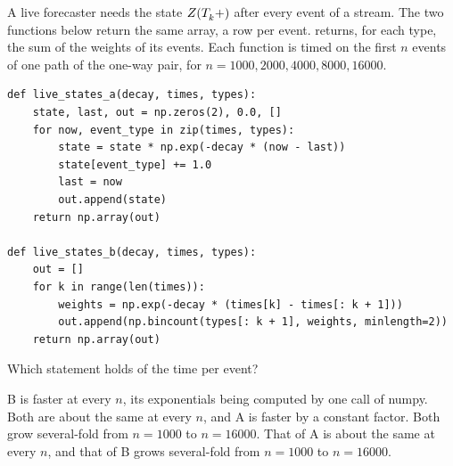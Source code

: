\begin{question}
\label{question.liveStateByRecursionAgainstRecomputation}
A live forecaster needs the state $\decayedCounts(\arrivalTimes[ ]_{k}+)$ after every event of a stream.
The two functions below return the same array, a row per event.
 returns, for each type,
the sum of the weights of its events.
Each function is timed on the first $n$ events of one path of the one-way pair,
for $n = 1000, 2000, 4000, 8000, 16000$.
\begin{lstlisting}[caption={Two ways to the state after every event}, label=listing.liveStateByRecursionAgainstRecomputation]
def live_states_a(decay, times, types):
    state, last, out = np.zeros(2), 0.0, []
    for now, event_type in zip(times, types):
        state = state * np.exp(-decay * (now - last))
        state[event_type] += 1.0
        last = now
        out.append(state)
    return np.array(out)

def live_states_b(decay, times, types):
    out = []
    for k in range(len(times)):
        weights = np.exp(-decay * (times[k] - times[: k + 1]))
        out.append(np.bincount(types[: k + 1], weights, minlength=2))
    return np.array(out)
\end{lstlisting}
Which statement holds of the time per event?
\begin{choices}
 \choice B is faster at every $n$, its exponentials being computed by one call of numpy.
 \choice Both are about the same at every $n$, and A is faster by a constant factor.
 \choice Both grow several-fold from $n = 1000$ to $n = 16000$.
 \correctchoice That of A is about the same at every $n$,
  and that of B grows several-fold from $n = 1000$ to $n = 16000$.
\end{choices}
\end{question}
